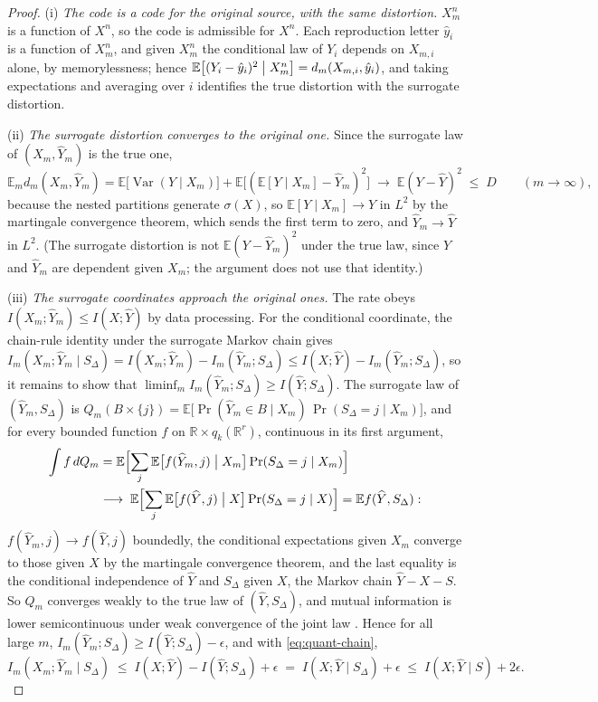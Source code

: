 \documentclass[11pt,onecolumn]{IEEEtran}
\newcommand{\E}{\mathbb{E}}
\newcommand{\R}{\mathbb{R}}
\newcommand{\hY}{\widehat{Y}}
\begin{document}
\begin{proof}
(i) \emph{The code is a code for the original source, with the same
distortion.} $X_m^n$ is a function of $X^n$, so the code is admissible
for $X^n$. Each reproduction letter $\hat y_i$ is a function of $X_m^n$,
and given $X_m^n$ the conditional law of $Y_i$ depends on $X_{m,i}$
alone, by memorylessness; hence
$\E\bigl[(Y_i-\hat y_i)^2\bigm|X_m^n\bigr]=d_m(X_{m,i},\hat y_i)$, and
taking expectations and averaging over $i$ identifies the true
distortion with the surrogate distortion.

(ii) \emph{The surrogate distortion converges to the original one.}
Since the surrogate law of $(X_m,\hY_m)$ is the true one,
\[
\E_m d_m(X_m,\hY_m)
=\E\bigl[\operatorname{Var}(Y\mid X_m)\bigr]
+\E\bigl[(\E[Y\mid X_m]-\hY_m)^2\bigr]
\;\longrightarrow\;\E(Y-\hY)^2\;\le\;D
\qquad(m\to\infty),
\]
because the nested partitions generate $\sigma(X)$, so
$\E[Y\mid X_m]\to Y$ in $L^2$ by the martingale convergence theorem,
which sends the first term to zero, and $\hY_m\to\hY$ in $L^2$. (The
surrogate distortion is not $\E(Y-\hY_m)^2$ under the true law, since
$Y$ and $\hY_m$ are dependent given $X_m$; the argument does not use
that identity.)

(iii) \emph{The surrogate coordinates approach the original ones.} The
rate obeys $I(X_m;\hY_m)\le I(X;\hY)$ by data processing. For the
conditional coordinate, the chain-rule identity under the surrogate
Markov chain gives
$I_m(X_m;\hY_m\mid S_\Delta)=I(X_m;\hY_m)-I_m(\hY_m;S_\Delta)
\le I(X;\hY)-I_m(\hY_m;S_\Delta)$, so it remains to show that
$\liminf_mI_m(\hY_m;S_\Delta)\ge I(\hY;S_\Delta)$. The surrogate law of
$(\hY_m,S_\Delta)$ is
$Q_m(B\times\{j\})=\E\bigl[\Pr(\hY_m\in B\mid X_m)\,
\Pr(S_\Delta=j\mid X_m)\bigr]$, and for every bounded function $f$ on
$\R\times q_k(\R^r)$, continuous in its first argument,
\begin{align*}
\int f\,dQ_m
&=\E\Bigl[\sum_j\E\bigl[f(\hY_m,j)\bigm|X_m\bigr]\Pr(S_\Delta=j\mid X_m)\Bigr]\\
&\longrightarrow\;
\E\Bigl[\sum_j\E\bigl[f(\hY,j)\bigm|X\bigr]\Pr(S_\Delta=j\mid X)\Bigr]
=\E f(\hY,S_\Delta):
\end{align*}
$f(\hY_m,j)\to f(\hY,j)$ boundedly, the conditional expectations given
$X_m$ converge to those given $X$ by the martingale convergence theorem,
and the last equality is the conditional independence of $\hY$ and
$S_\Delta$ given $X$, the Markov chain $\hY-X-S$. So $Q_m$ converges
weakly to the true law of $(\hY,S_\Delta)$, and mutual information is
lower semicontinuous under weak convergence of the joint law
\cite{posner1975}. Hence for all large $m$,
$I_m(\hY_m;S_\Delta)\ge I(\hY;S_\Delta)-\epsilon$, and with
\eqref{eq:quant-chain},
\[
I_m(X_m;\hY_m\mid S_\Delta)\;\le\;I(X;\hY)-I(\hY;S_\Delta)+\epsilon
\;=\;I(X;\hY\mid S_\Delta)+\epsilon\;\le\;I(X;\hY\mid S)+2\epsilon .
\]


\end{proof}
\end{document}
